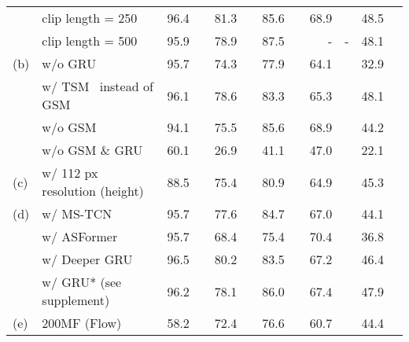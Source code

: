 \documentclass[runningheads]{llncs}
\newcommand{\nms}{\textsuperscript{\textdagger}}
\begin{document}
\begin{table*}[t]
{\begin{tabularx}{\textwidth}{ll rr rr rr rr rr}
        & \tabindent clip length = 250
            & 96.4 & 
            & \nms 81.3 & 
            & \nms 85.6 & 
            & 68.9 & 
            & \nms 48.5 &  \\
        & \tabindent clip length = 500
            & 95.9 & 
            & \nms 78.9 & 
            & \nms 87.5 & 
            & - & -
            & \nms 48.1 & \\
        \midrule
        (b)
        & \tabindent w/o GRU
            & \nms 95.7 &  
            & \nms 74.3 & 
            & \nms 77.9 & 
            & 64.1 & 
            & \nms 32.9 &  \\
        & \tabindent w/ TSM~\cite{tsm} instead of GSM
            & 96.1 & 
            & \nms 78.6 & 
            & \nms 83.3 & 
            & \nms 65.3 & 
            & \nms 48.1 & \\
        & \tabindent w/o GSM
            & \nms 94.1 & 
            & \nms 75.5 & 
            & \nms 85.6 & 
            & 68.9 & 
            & \nms 44.2 &  \\
        & \tabindent w/o GSM \& GRU
            & \nms 60.1 & 
            & \nms 26.9 & 
            & \nms 41.1 & 
            & \nms 47.0 & 
            & \nms 22.1 &  \\
        \midrule
        (c)
        & \tabindent w/ 112 px resolution (height)
            & \nms 88.5 & 
            & \nms 75.4 & 
            & \nms 80.9 & 
            & \nms 64.9 & 
            & \nms 45.3 &  \\
        \midrule
        (d)
        & \tabindent w/ MS-TCN
            & 95.7 &  
            & \nms 77.6 & 
            & \nms 84.7 & 
            & 67.0 & 
            & \nms 44.1 &  \\
        & \tabindent w/ ASFormer
            & 95.7 &  
            & \nms 68.4 & 
            & \nms 75.4 & 
            & 70.4 & 
            & \nms 36.8 & \\
        & \tabindent w/ Deeper GRU
            & 96.5 &  
            & \nms 80.2 & 
            & \nms 83.5 & 
            & 67.2 & 
            & \nms 46.4 &  \\
        & \tabindent w/ GRU* (see supplement)
            & 96.2 &  
            & \nms 78.1 & 
            & \nms 86.0 & 
            & 67.4 & 
            & \nms 47.9 &  \\
        \midrule
        (e)
        & 200MF (Flow)
            & \nms 58.2 & 
            & \nms 72.4 & 
            & \nms 76.6 & 
            & \nms 60.7 & 
            & \nms 44.4 &  \\

\end{tabularx}}
\end{table*}
\end{document}
